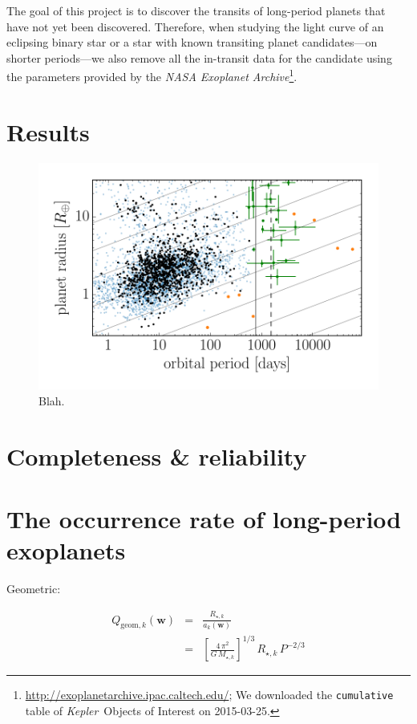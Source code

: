 \documentclass[preprint]{aastex}
\newcommand{\project}[1]{\textsl{#1}}
\newcommand{\kepler}{\project{Kepler}}
\newcommand{\figlabel}[1]{\label{fig:#1}}
\newcommand{\bvec}[1]{{\ensuremath{\boldsymbol{#1}}}}
\newcommand{\params}{{\ensuremath{\bvec{w}}}}
\begin{document}
The goal of this project is to discover the transits of long-period planets
that have not yet been discovered.
Therefore, when studying the light curve of an eclipsing binary star or a star
with known transiting planet candidates---on shorter periods---we also remove
all the in-transit data for the candidate using the parameters provided by the
\project{NASA Exoplanet
Archive}\footnote{\url{http://exoplanetarchive.ipac.caltech.edu/}; We
downloaded the \texttt{cumulative} table of \kepler\ Objects of Interest on
2015-03-25.}.


\section{Results}

\begin{figure}[p]
\begin{center}
\includegraphics{figures/full_sample.pdf}
\end{center}
\caption{%
Blah.
\figlabel{full-sample}}
\end{figure}


\section{Completeness \& reliability}


\section{The occurrence rate of long-period exoplanets}

Geometric:

\begin{eqnarray}
Q_{\mathrm{geom},k} (\params) &=& \frac{R_{\star,k}}{a_k(\params)} \\
&=& \left[\frac{4\,\pi^2}{G\,M_{\star,k}}\right]^{1/3}\,R_{\star,k}\,P^{-2/3}
\end{eqnarray}
\end{document}
